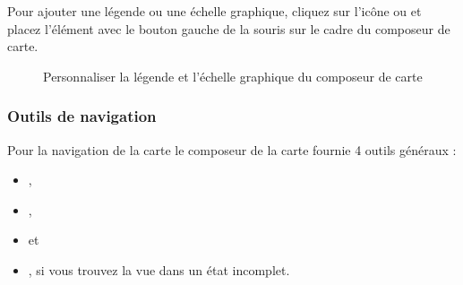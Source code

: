 
Pour ajouter une légende ou une échelle graphique, cliquez sur l'icône
 ou
 et placez
l'élément avec le bouton gauche de la souris sur le cadre du composeur de carte.

\begin{figure}[ht]
\centering
\caption{Personnaliser la légende et l'échelle graphique du composeur de carte
\nixcaption}\label{fig:print_composer_tab1}
    \goodgap
\end{figure}

\subsubsection{Outils de navigation}

Pour la navigation de la carte le composeur de la carte fournie 4 outils
généraux :

\begin{itemize}
\item {},
\item {},
\item {} et
\item {}, si vous trouvez la vue dans
un état incomplet.
\end{itemize}

